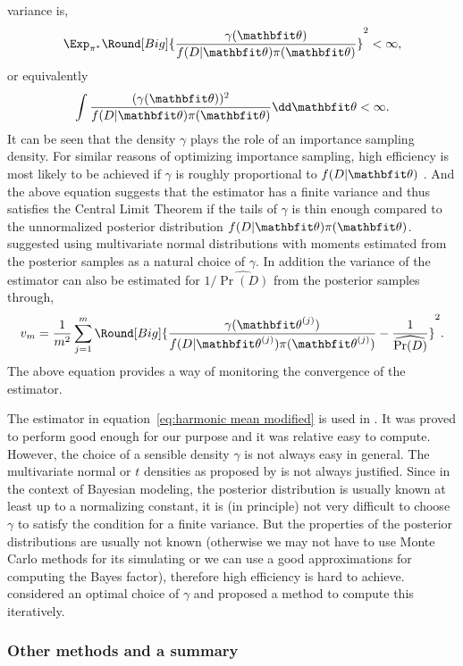 variance is,
\begin{equation}
  \Exp_{\pi^*}\Round[Big]{\frac{\gamma(\bth)}{f(D|\bth)\pi(\bth)}}^2 < \infty,
\end{equation}
or equivalently
\begin{equation}
  \int \frac{(\gamma(\bth))^2}{f(D|\bth)\pi(\bth)}\dd\bth < \infty.
\end{equation}
It can be seen that the density $\gamma$ plays the role of an importance
sampling density. For similar reasons of optimizing importance sampling, high
efficiency is most likely to be achieved if $\gamma$ is roughly proportional
to $f(D|\bth)$ \parencite{Kass1995}. And the above equation suggests that the
estimator has a finite variance and thus satisfies the Central Limit Theorem
if the tails of $\gamma$ is thin enough compared to the unnormalized posterior
distribution $f(D|\bth)\pi(\bth)$. \textcite{Gelfand1994} suggested using
multivariate normal distributions with moments estimated from the posterior
samples as a natural choice of $\gamma$. In addition the variance of the
estimator can also be estimated for $1/\widehat{\Pr(D)}$ from the posterior
samples through,
\begin{equation}
  v_m = \frac{1}{m^2}\sum_{j=1}^m \Round[Big]{
    \frac{\gamma(\bth^{(j)})}{f(D|\bth^{(j)})\pi(\bth^{(j)})}
    - \frac{1}{\widehat{\Pr(D)}}}^2.
\end{equation}
The above equation provides a way of monitoring the convergence of the
estimator.

The estimator in equation~\eqref{eq:harmonic mean modified} is used in
\textcite{Zhou2011}. It was proved to perform good enough for our purpose and
it was relative easy to compute. However, the choice of a sensible density
$\gamma$ is not always easy in general. The multivariate normal or $t$
densities as proposed by \textcite{Gelfand1994} is not always justified. Since
in the context of Bayesian modeling, the posterior distribution is usually
known at least up to a normalizing constant, it is (in principle) not very
difficult to choose $\gamma$ to satisfy the condition for a finite variance.
But the properties of the posterior distributions are usually not known
(otherwise we may not have to use Monte Carlo methods for its simulating or we
can use a good approximations for computing the Bayes factor), therefore high
efficiency is hard to achieve. \textcite{Meng1996} considered an optimal
choice of $\gamma$ and proposed a method to compute this iteratively.

\subsubsection{Other methods and a summary}
\label{ssub:Other methods and a summary a}

